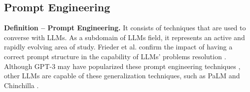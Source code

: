 

\subsection{Prompt Engineering}


\textbf{Definition -- Prompt Engineering.} It consists of techniques that are used to converse with LLMs. As a subdomain of LLMs field, it represents an active and rapidly evolving area of study. Frieder et al. confirm the impact of having a correct prompt structure in the capability of LLMs' problems resolution \cite{10.5555/3666122.3667327}. 
Although GPT-3 may have popularized these prompt engineering techniques \cite{10.5555/3495724.3495883}, other LLMs are capable of these generalization techniques, such as PaLM \cite{10.5555/3648699.3648939} and Chinchilla \cite{10.5555/3600270.3602446}.

